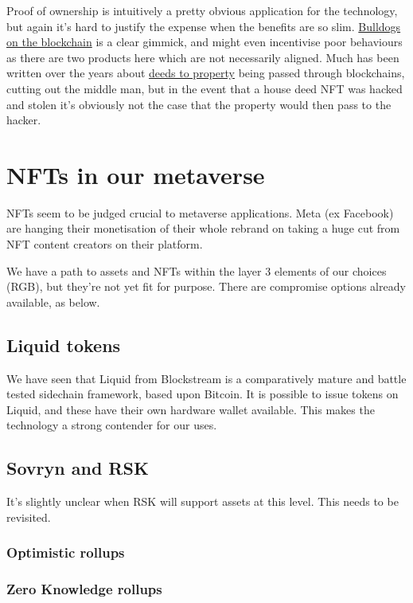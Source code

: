 Proof of ownership is intuitively a pretty obvious application for the technology, but again it's hard to justify the expense when the benefits are so slim. \href{https://www.bullishlybred.com/}{Bulldogs on the blockchain} is a clear gimmick, and might even incentivise poor behaviours as there are two products here which are not necessarily aligned. Much has been written over the years about \href{https://propy.com/browse/propy-nft/}{deeds to property} being passed through blockchains, cutting out the middle man, but in the event that a house deed NFT was hacked and stolen it's obviously not the case that the property would then pass to the hacker.

\section{NFTs in our metaverse}
NFTs seem to be judged crucial to metaverse applications. Meta (ex Facebook) are hanging their monetisation of their whole rebrand on taking a huge cut from NFT content creators on their platform.\par
We have a path to assets and NFTs within the layer 3 elements of our choices (RGB), but they're not yet fit for purpose. There are compromise options already available, as below.
\subsection{Liquid tokens}
We have seen that Liquid from Blockstream is a comparatively mature and battle tested sidechain framework, based upon Bitcoin. It is possible to issue tokens on Liquid, and these have their own hardware wallet available. This makes the technology a strong contender for our uses.
\subsection{Sovryn and RSK}
It's slightly unclear when RSK will support assets at this level. This needs to be revisited.
\subsubsection{Optimistic rollups}
\lipsum[50]
\subsubsection{Zero Knowledge rollups}
\lipsum[50]
